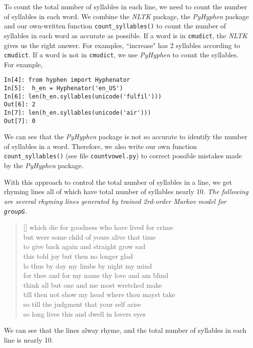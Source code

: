 To count the total number of syllables in each line, we need to count the number of syllables in each word. We combine the \textit{NLTK} package, the \textit{PyHyphen} package and our own-written function \texttt{count\_syllables()} to count the number of syllables in each word as accurate as possible. If a word is in \texttt{cmudict}, the \textit{NLTK} gives us the right answer. For examples, ``increase" has 2 syllables according to \texttt{cmudict}. If a word is not in \texttt{cmudict}, we use \textit{PyHyphen} to count the syllables. For example,
\begin{lstlisting}
In[4]: from hyphen import Hyphenator
In[5]:  h_en = Hyphenator('en_US')
In[6]: len(h_en.syllables(unicode('fulfil')))
Out[6]: 2
In[7]: len(h_en.syllables(unicode('air')))
Out[7]: 0
\end{lstlisting}
We can see that the \textit{PyHyphen} package is not so accurate to identify the number of syllables in a word. Therefore, we also write our own function \texttt{count\_syllables()} (see file \texttt{countvowel.py}) to correct possible mistakes made by the \textit{PyHyphen} package.

With this approach to control the total number of syllables in a line, we get rhyming lines all of which have total number of syllables nearly 10. \textit{The following are several rhyming lines generated by trained 2rd-order Markov model for \texttt{groupG}.}
\settowidth{\versewidth}{even  see  shall  accessary  used  must  find  and  herself  enfeebled  mine  it}
\begin{verse}[\versewidth]
 which  die  for  goodness  who  have  lived  for  crime \\
 but  were  some  child  of  yours  alive  that  time \\
 to  give  back  again  and  straight  grow  sad \\
 this  told  joy  but  then  no  longer  glad \\
 lo  thus  by  day  my  limbs  by  night  my  mind \\
 for  thee  and  for  my  name  thy  love  and  am  blind \\
 think  all  but  one  and  me  most  wretchcd  make \\
 till  then  not  show  my  head  where  thou  mayst  take \\
 so  till  the  judgment  that  your  self  arise \\
 so  long  lives  this  and  dwell  in  lovers  eyes
\end{verse}
We can see that the lines alway rhyme, and the total number of syllables in each line is nearly 10.



